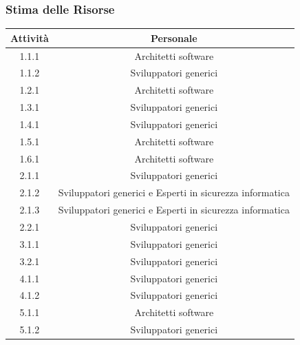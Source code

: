 \subsubsection{Stima delle Risorse}
\begin{table}[H]
    \centering
    \begin{tabular}{|c|c|}
        \hline
        \textbf{Attività} & \textbf{Personale}                                       \\
        \hline
        1.1.1             & Architetti software                                      \\
        1.1.2             & Sviluppatori generici                                    \\
        1.2.1             & Architetti software                                      \\
        1.3.1             & Sviluppatori generici                                    \\
        1.4.1             & Sviluppatori generici                                    \\
        1.5.1             & Architetti software                                      \\
        1.6.1             & Architetti software                                      \\
        2.1.1             & Sviluppatori generici                                    \\
        2.1.2             & Sviluppatori generici e Esperti in sicurezza informatica \\
        2.1.3             & Sviluppatori generici e Esperti in sicurezza informatica \\
        2.2.1             & Sviluppatori generici                                    \\
        3.1.1             & Sviluppatori generici                                    \\
        3.2.1             & Sviluppatori generici                                    \\
        4.1.1             & Sviluppatori generici                                    \\
        4.1.2             & Sviluppatori generici                                    \\
        5.1.1             & Architetti software                                      \\
        5.1.2             & Sviluppatori generici                                    \\

\end{tabular}
\end{table}
